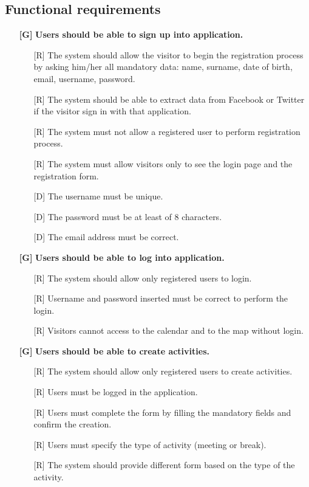\documentclass[12pt,titlepage]{article}
\begin{document}
\subsection{Functional requirements}\label{sec:mod1}
\begin{itemize}
\item[\textbf{ {[G\ped{1}]}}]	\textbf{	Users should be able to sign up into application.}
\begin{itemize}
\item[{[R\ped{1}]}] The system should allow the visitor to begin the registration process by asking him/her all mandatory data: name, surname, date of birth, email, username, password.
\item[{[R\ped{2}]}] The system should be able to extract data from Facebook or Twitter if the visitor sign in with that application.
\item[{[R\ped{3}]}] The system must not allow a registered user to perform registration process.
\item[{[R\ped{4}]}] The system must allow visitors only to see the login page and the registration form.

\item[{[D\ped{1}]}] The username must be unique.
\item[{[D\ped{2}]}] The password must be at least of 8 characters.
\item[{[D\ped{3}]}] The email address must be correct.
\end{itemize}
\item[\textbf{ {[G\ped{2}]}}]	\textbf{	Users should be able to log into application.}
\begin{itemize}
\item[{[R\ped{1}]}] The system should allow only registered users to login.
\item[{[R\ped{2}]}] Username and password inserted must be correct to perform the login.
\item[{[R\ped{3}]}] Visitors cannot access to the calendar and to the map without login.
\end{itemize}
\item[\textbf{ {[G\ped{3}]}}]	\textbf{	Users should be able to create activities.}
\begin{itemize}
\item[{[R\ped{1}]}] The system should allow only registered users to create activities.
\item[{[R\ped{2}]}] Users must be logged in the application.
\item[{[R\ped{3}]}] Users must complete the form by filling the mandatory fields and confirm the creation.
\item[{[R\ped{4}]}] Users must specify the type of activity (meeting or break).
\item[{[R\ped{5}]}] The system should provide different form based on the type of the activity.


\end{itemize}
\end{itemize}
\end{document}
